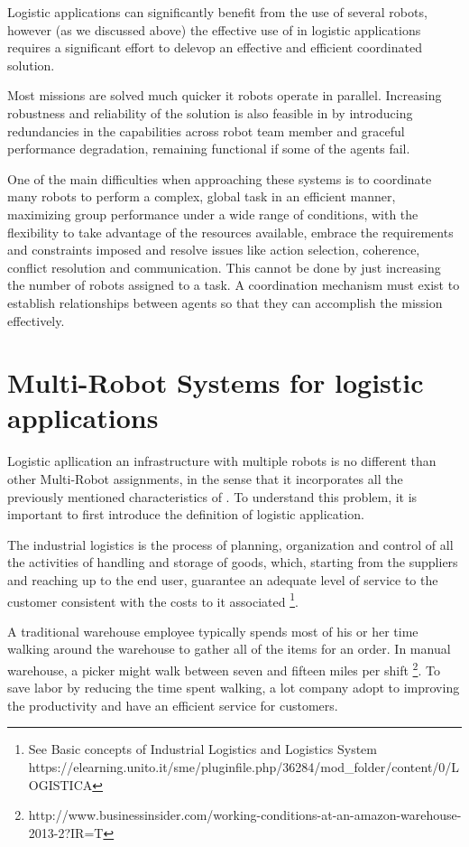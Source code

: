 Logistic applications can significantly benefit from the use of several robots, however  
(as we discussed above) the effective use of \mrs in logistic applications requires a 
significant effort to delevop an effective and efficient coordinated solution.

Most missions are solved much quicker it robots operate in parallel. 
Increasing robustness and reliability of the solution is also feasible in \mrs by 
introducing redundancies in the capabilities across robot team member and graceful 
performance degradation, remaining functional if some of the agents fail.

One of the main difficulties when approaching these systems is to coordinate
many robots to perform a complex, global task in an efficient manner, maximizing
group performance under a wide range of conditions, with the flexibility to take
advantage of the resources available, embrace the requirements and constraints
imposed and resolve issues like action selection, coherence, conflict resolution and
communication. This cannot be done by just increasing the number of robots
assigned to a task.
A coordination mechanism must exist to establish relationships between agents so
that they can accomplish the mission effectively.

\section{Multi-Robot Systems for logistic applications} \label{mrs:logistic}
Logistic apllication an infrastructure with multiple robots is no different than other Multi-Robot
assignments, in the sense that it incorporates all the previously mentioned
characteristics of \mrs. To understand this problem, it is important to first
introduce the definition of logistic application.

\begin{mydef}
    The industrial logistics is the process of planning, organization and control of all the activities of handling and storage of goods, which, starting from the suppliers and reaching up to the end user, guarantee an adequate level of service to the customer consistent with the costs to it associated
    \footnote{See Basic concepts of Industrial Logistics and Logistics System https://elearning.unito.it/sme/pluginfile.php/36284/mod\_folder/content/0/LOGISTICA}.
\end{mydef}

A traditional warehouse employee typically spends most of his or her time walking 
around the warehouse to gather all of the items for an order. In manual warehouse,
a picker might walk between seven and fifteen miles per shift \footnote{http://www.businessinsider.com/working-conditions-at-an-amazon-warehouse-2013-2?IR=T}. 
To save labor by reducing the time spent walking, a lot company adopt \mrs to improving 
the productivity and have an efficient service for customers.

